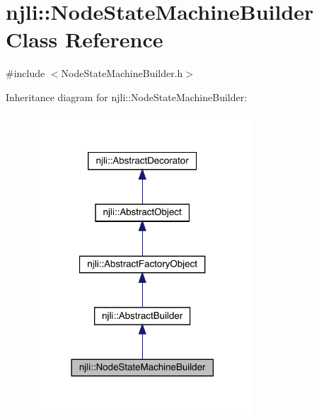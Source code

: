 \hypertarget{classnjli_1_1_node_state_machine_builder}{}\section{njli\+:\+:Node\+State\+Machine\+Builder Class Reference}
\label{classnjli_1_1_node_state_machine_builder}


{\ttfamily \#include $<$Node\+State\+Machine\+Builder.\+h$>$}



Inheritance diagram for njli\+:\+:Node\+State\+Machine\+Builder\+:\nopagebreak
\begin{figure}[H]
\begin{center}
\leavevmode
\includegraphics[width=230pt]{classnjli_1_1_node_state_machine_builder__inherit__graph}
\end{center}
\end{figure}


